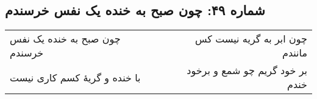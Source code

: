 \begin{center}
\section*{شماره ۴۹: چون صبح به خنده یک نفس خرسندم}
\label{sec:049}
\begin{longtable}{l p{0.5cm} r}
چون صبح به خنده یک نفس خرسندم
&&
چون ابر به گریه نیست کس مانندم
\\
با خنده و گریهٔ کسم کاری نیست
&&
بر خود گریم چو شمع و برخود خندم
\\
\end{longtable}
\end{center}
